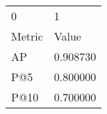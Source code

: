 \begin{tabular}{ll}
0 & 1 \\
Metric & Value \\
AP & 0.908730 \\
P@5 & 0.800000 \\
P@10 & 0.700000 \\
\end{tabular}
